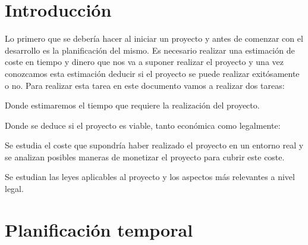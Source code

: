 \label{anex:A}

\section{Introducción}

Lo primero que se debería hacer al iniciar un proyecto y antes de comenzar con el desarrollo es la planificación del mismo. Es necesario realizar una estimación de coste en tiempo y dinero que nos va a suponer realizar el proyecto y una vez conozcamos esta estimación deducir si el proyecto se puede realizar exitósamente o no. 
Para realizar esta tarea en este documento vamos a realizar dos tareas:

\begin{description}
	\tightlist
	\item[Planificación temporal.] Donde estimaremos el tiempo que requiere la realización del proyecto.
	\item[Estudio de la viabilidad.] Donde se deduce si el proyecto es viable, tanto económica como legalmente: 
	\begin{description}
		\tightlist
		\item[Viabilidad económica.] Se estudia el coste que supondría haber realizado el proyecto en un entorno real y se analizan posibles maneras de monetizar el proyecto para cubrir este coste.
		\item[Viabilidad legal.] Se estudian las leyes aplicables al proyecto y los aspectos más relevantes a nivel legal.
	\end{description}
\end{description}

\section{Planificación temporal}


